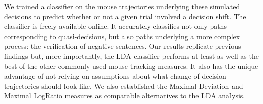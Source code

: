 \documentclass[11pt]{article}
\newcommand{\changeEC}[2]{{\footnotesize\textcolor{gray}{#1}}\textcolor{blue}{#2}}
\newcommand{\nbEC}[1]{{\leavevmode\color{blue}{\scriptsize#1}}}
\begin{document}
We trained a classifier on the mouse trajectories underlying these simulated decisions to predict whether or not a given trial involved a decision shift. The classifier is freely available online. It accurately classifies not only paths corresponding to quasi-decisions, but also paths underlying a more complex process: the verification of negative sentences. Our results replicate previous findings but, more importantly, the LDA classifier performs at least as well as the best of the other commonly used mouse tracking measures. It also has the unique advantage of not relying on assumptions about what change-of-decision trajectories should look like. We also established the Maximal Deviation and Maximal LogRatio measures as comparable alternatives to the LDA analysis. 





%
    
    

\end{document}

